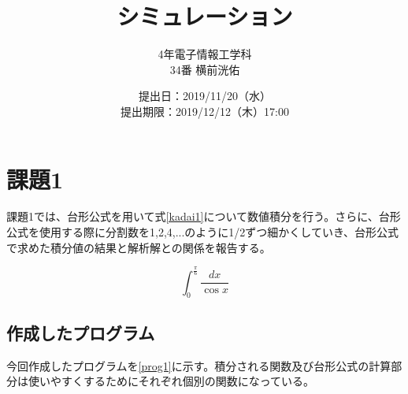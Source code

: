 \documentclass[10pt,titlepage]{jsarticle}
\title{シミュレーション}
\author{4年電子情報工学科\\34番 横前洸佑}
\date{提出日：2019/11/20（水）\\	提出期限：2019/12/12（木）17:00}
\begin{document}
\maketitle

\section{課題1}
課題1では、台形公式を用いて式\ref{kadai1}について数値積分を行う。さらに、台形公式を使用する際に分割数を1,2,4,...のように1/2ずつ細かくしていき、台形公式で求めた積分値の結果と解析解との関係を報告する。

\begin{equation}
\label{kadai1}
	\int_0^\frac{\pi}{6} \frac{dx}{\cos x}
\end{equation}

\subsection{作成したプログラム}
今回作成したプログラムを\ref{prog1}に示す。積分される関数及び台形公式の計算部分は使いやすくするためにそれぞれ個別の関数になっている。


\end{document}
